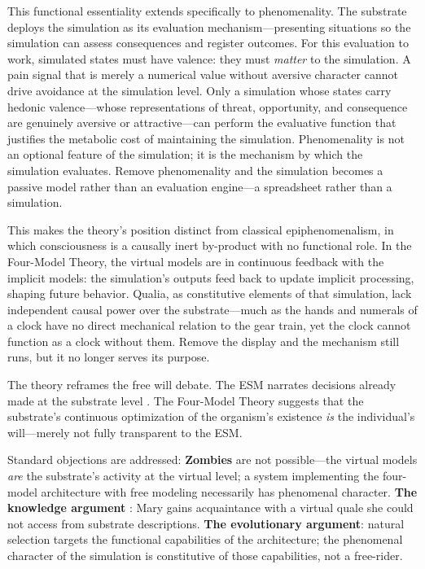 \documentclass[12pt]{article}
\begin{document}
This functional essentiality extends specifically to phenomenality. The substrate deploys the simulation as its evaluation mechanism---\hspace{0pt}presenting situations so the simulation can assess consequences and register outcomes. For this evaluation to work, simulated states must have valence: they must \emph{matter} to the simulation. A pain signal that is merely a numerical value without aversive character cannot drive avoidance at the simulation level. Only a simulation whose states carry hedonic valence---\hspace{0pt}whose representations of threat, opportunity, and consequence are genuinely aversive or attractive---\hspace{0pt}can perform the evaluative function that justifies the metabolic cost of maintaining the simulation. Phenomenality is not an optional feature of the simulation; it is the mechanism by which the simulation evaluates. Remove phenomenality and the simulation becomes a passive model rather than an evaluation engine---\hspace{0pt}a spreadsheet rather than a simulation.

This makes the theory's position distinct from classical epiphenomenalism, in which consciousness is a causally inert by-product with no functional role. In the Four-Model Theory, the virtual models are in continuous feedback with the implicit models: the simulation's outputs feed back to update implicit processing, shaping future behavior. Qualia, as constitutive elements of that simulation, lack independent causal power over the substrate---\hspace{0pt}much as the hands and numerals of a clock have no direct mechanical relation to the gear train, yet the clock cannot function as a clock without them. Remove the display and the mechanism still runs, but it no longer serves its purpose.

The theory reframes the free will debate. The ESM narrates decisions already made at the substrate level \citep{Libet1985,Schurger2012,Wegner2002}. The Four-Model Theory suggests that the substrate's continuous optimization of the organism's existence \emph{is} the individual's will---\hspace{0pt}merely not fully transparent to the ESM.

Standard objections are addressed: \textbf{Zombies} \citep{Chalmers1996} are not possible---\hspace{0pt}the virtual models \emph{are} the substrate's activity at the virtual level; a system implementing the four-model architecture with free modeling necessarily has phenomenal character. \textbf{The knowledge argument} \citep{Jackson1982}: Mary gains acquaintance with a virtual quale she could not access from substrate descriptions. \textbf{The evolutionary argument}: natural selection targets the functional capabilities of the architecture; the phenomenal character of the simulation is constitutive of those capabilities, not a free-rider.
\end{document}
